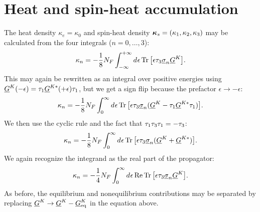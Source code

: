 \section{Heat and spin-heat accumulation}
The heat density $\kappa_{e} = \kappa_0$ and spin-heat density $\bm{\kappa}_{s} = (\kappa_1, \kappa_2, \kappa_3)$ may be calculated from the four integrals ($n=0,\ldots,3$):
\begin{equation}
  \kappa_n = -\frac{1}{8}N_F  \int_{-\infty}^{+\infty} d^{}\epsilon \operatorname{Tr}\big[ \epsilon\tau_{3}\underline{\sigma}_{n} \underline{G}^K \big].
\end{equation}
This may again be rewritten as an integral over positive energies using $\underline{G}^K(-\epsilon) = \tau_{1} \underline{G}^{K*}(+\epsilon) \tau_{1}$, but we get a sign flip because the prefactor $\epsilon \rightarrow -\epsilon$:
\begin{equation}
  \kappa_n = -\frac{1}{8}N_F  \int_{0}^{\infty} d^{}\epsilon \operatorname{Tr}\big[ \epsilon\tau_{3}\underline{\sigma}_{n} (\underline{G}^K - \tau_{1} \underline{G}^{K*} \tau_{1}) \big].
\end{equation}
We then use the cyclic rule and the fact that $\tau_{1}\tau_{3}\tau_{1} = -\tau_{3}$:
\begin{equation}
  \kappa_n = -\frac{1}{8}N_F  \int_{0}^{\infty} d^{}\epsilon \operatorname{Tr}\big[ \epsilon\tau_{3}\underline{\sigma}_{n} (\underline{G}^K + \underline{G}^{K*}) \big].
\end{equation}
We again recognize the integrand as the real part of the propagator:
\begin{equation}
  \kappa_n = -\frac{1}{4}N_F  \int_{0}^{\infty} d^{}\epsilon \operatorname{Re}\operatorname{Tr}\big[ \epsilon\tau_{3}\underline{\sigma}_{n} \underline{G}^K \big].
\end{equation}
As before, the equilibrium and nonequilibrium contributions may be separated by replacing $\underline{G}^K \rightarrow \underline{G}^K - \underline{G}^K_\text{eq}$ in the equation above.



\clearpage
